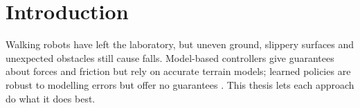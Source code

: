 \chapter{Introduction}
\label{ch:introduction}

Walking robots have left the laboratory, but uneven ground, slippery surfaces and unexpected
obstacles still cause falls. Model-based controllers give guarantees about forces and friction
but rely on accurate terrain models; learned policies are robust to modelling errors but offer
no guarantees \citep{hwangbo2019}. This thesis lets each approach do what it does best.
